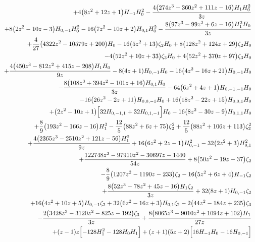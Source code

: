 \begin{eqnarray}
\nonumber \\ &&
+4\big(8 z^2+12 z+1\big) H_{-1} H_0^2-\frac{4 \big(274 z^3-360 z^2+111 z-16\big)  H_1 H_0^2}{3 z}
\nonumber \\ &&
+8  \big(2 z^2-10 z-3\big) H_{0,-1} H_0^2
-16 \big(7 z^2-10 z+2\big) H_{0,1} H_0^2-\frac{8 \big(97 z^3-99 z^2+6  z-16\big) H_1^2  H_0}{3 z}
\nonumber \\ &&
+\frac{4}{27} \big(4322 z^2-10579 z+200\big) H_0
-16  \big(5 z^2+13\big) \zeta_2 H_0+8 \big(128 z^2+124 z+29\big)\zeta_2 H_0
\nonumber \\ &&
-4  \big(52 z^2+10 z+33\big) \zeta_3 H_0+4 \big(52 z^2+370 z+97\big)\zeta_3 H_0
\nonumber \\ &&
+\frac{4 \big(450 z^3-812 z^2+415 z-208\big) H_1 H_0}{9 z}-8(4 z+1) H_{0,-1} H_0-16  
\big(4 z^2-16 z+21\big) H_{0,-1} H_0
\nonumber \\ &&
-\frac{8  \big(108 z^3+394 z^2-101 z+16\big) H_{0,1} H_0}{3 z}-64  \big(6 z^2+4z+1\big) H_{0,-1,-1} H_0
\nonumber \\ &&
-16  \big(26 z^2-2 z+11\big) H_{0,0,-1} H_0+16\big(18 z^2-22 z+15\big) H_{0,0,1} H_0
\nonumber \\ &&
+\big(2 z^2-10 z+1\big) \Bigl[32H_{0,-1,1}+32 H_{0,1,-1}\Bigr] H_0-16 \big(8 z^2-30 z-9\big) H_{0,1,1}H_0
\nonumber \\ &&
+\frac{8}{9} \big(193 z^2-166 z-16\big) H_1^3
-\frac{12}{5}  \big(88z^2+6 z+75\big) \zeta_2^2+\frac{12}{5} \big(88 z^2+106 z+113\big)\zeta_2^2
\nonumber \\ &&
+\frac{4 \big(2365 z^3-2510 z^2+121 z-56\big) H_1^2}{9 z}+16 \big(6 z^2+2 z-1\big) H_{0,-1}^2-32 \big(2 z^2+3\big)H_{0,1}^2
\nonumber \\ &&
+\frac{122748 z^3-97910 z^2-30697 z-1440}{54 z}+8  \big(50z^2-19 z-37\big) \zeta_2
\nonumber \\ &&
-\frac{8}{9} \big(1207 z^2-1190 z-233\big)\zeta_2-16  \big(5 z^2+6 z+4\big) H_{-1} \zeta_2
\nonumber \\ &&
+\frac{8  \big(52 z^3-78 z^2+45 z-16\big) H_1 \zeta_2}{3 z}+32  (8 z+1)H_{0,-1} \zeta_2
\nonumber \\ &&
+16 \big(4 z^2+10 z+5\big) H_{0,-1} \zeta_2+32\big(6 z^2-16 z+3\big) H_{0,1} \zeta_2-2  \big(44 z^2-184z+235\big) \zeta_3
\nonumber \\ &&
-\frac{2 \big(3428 z^3-3120 z^2-825 z-192\big)  \zeta_3}{3 z}+\frac{8 \big(8065 z^3-9010 z^2+1094 z+102\big) H_1}{27  z}
\nonumber \\ &&
+(z-1) z \Bigl[-128  H_1^2-128  H_0 H_1\Bigr]+(z+1) (5 z+2)\Bigl[16 H_{-1} H_0-16 H_{0,-1}\Bigr]

\end{eqnarray}
